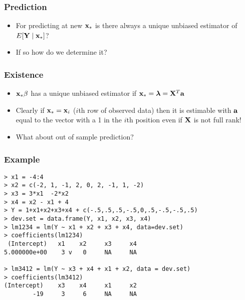 \documentclass{beamer}
\begin{document}
\begin{frame} \frametitle{Prediction}
  \begin{itemize}
  \item   For predicting at new $\mathbf{x}_*$ is there always a unique unbiased
  estimator of $E[\mathbf{Y} \mid \mathbf{x}_*]$? \pause
\item If so how do we determine it?

  \end{itemize}

\end{frame}
\begin{frame} \frametitle{Existence}
  \begin{itemize}
  \item  $\mathbf{x}_* \beta$ has a unique unbiased estimator if $\mathbf{x}_* =
    \boldsymbol{\lambda} = \mathbf{X}^T \mathbf{a}$ \pause
\item Clearly if $\mathbf{x}_* = \mathbf{x}_i$ ($i$th row of observed data) then it is
  estimable with $\mathbf{a}$ equal to the vector with a 1 in the $i$th position
  even if $\mathbf{X}$ is not full rank! \pause
\item What about out of sample prediction? \pause
\end{itemize}

\end{frame}


\begin{frame}[fragile] \frametitle{Example}
\begin{verbatim}
> x1 = -4:4
> x2 = c(-2, 1, -1, 2, 0, 2, -1, 1, -2)
> x3 = 3*x1  -2*x2
> x4 = x2 - x1 + 4
> Y = 1+x1+x2+x3+x4 + c(-.5,.5,.5,-.5,0,.5,-.5,-.5,.5)
> dev.set = data.frame(Y, x1, x2, x3, x4)
> lm1234 = lm(Y ~ x1 + x2 + x3 + x4, data=dev.set)
> coefficients(lm1234)
 (Intercept)   x1    x2     x3     x4 
5.000000e+00    3 v   0     NA     NA 

> lm3412 = lm(Y ~ x3 + x4 + x1 + x2, data = dev.set)
> coefficients(lm3412)
(Intercept)    x3    x4     x1     x2 
        -19     3     6     NA     NA 
\end{verbatim}
\end{frame}
\end{document}
